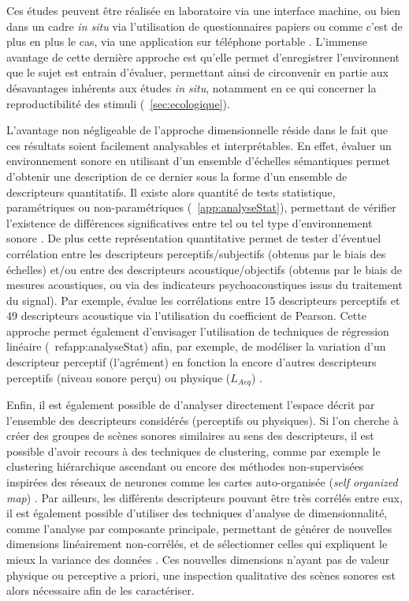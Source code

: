 Ces études peuvent être réalisée en laboratoire via une interface machine, ou bien dans un cadre \emph{in situ} via l'utilisation de questionnaires papiers \citep{jeon2013soundwalk,torija2013application} ou comme c'est de plus en plus le cas, via une application sur téléphone portable \citep{kardous2014evaluation,ricciardi2015sound}. L'immense avantage de cette dernière approche est qu'elle permet d'enregistrer l'environnent que le sujet est entrain d'évaluer, permettant ainsi de circonvenir en partie aux désavantages inhérents aux études \emph{in situ}, notamment en ce qui concerner la reproductibilité des stimuli (\Cf~\ref{sec:ecologique}).

L'avantage non négligeable de l'approche dimensionnelle réside dans le fait que ces résultats soient facilement analysables et interprétables. En effet, évaluer un environnement sonore  en utilisant d'un ensemble d'échelles sémantiques permet d'obtenir une description de ce dernier sous la forme d'un ensemble de descripteurs quantitatifs. Il existe alors quantité de tests statistique, paramétriques ou non-paramétriques (\Cf~\ref{app:analyseStat}), permettant de vérifier l'existence de différences significatives entre tel ou tel type d'environnement sonore \citep{hong2013designing}. De plus cette représentation quantitative permet de tester d'éventuel corrélation entre les descripteurs perceptifs/subjectifs (obtenus par le biais des échelles) et/ou entre des descripteurs acoustique/objectifs (obtenus par le biais de mesures acoustiques, ou via des indicateurs psychoacoustiques issus du traitement du signal). Par exemple, \citep{torija2013application} évalue les corrélations entre 15 descripteurs perceptifs et 49 descripteurs acoustique via l'utilisation du coefficient de Pearson. Cette approche permet également d'envisager l'utilisation de techniques de régression linéaire (\Cf~ref{app:analyseStat}) afin, par exemple, de modéliser la variation d'un descripteur perceptif (l'agrément) en fonction la encore d'autres descripteurs perceptifs (niveau sonore perçu) ou physique ($L_{Aeq}$) \citep{lavandier2006contribution,ricciardi2015sound}.

Enfin, il est également possible de d'analyser directement l'espace décrit par l'ensemble des descripteurs considérés (perceptifs ou physiques). Si l'on cherche à créer des groupes de scènes sonores similaires au sens des descripteurs, il est possible d'avoir recours à des techniques de clustering, comme par exemple le clustering hiérarchique ascendant \citep{torija2013application} ou encore des méthodes non-supervisées inspirées des réseaux de neurones comme les cartes auto-organisée (\emph{self organized map}) \citep{ricciardi2015sound}. Par ailleurs, les différents descripteurs pouvant être très corrélés entre eux, il est également possible d'utiliser des techniques d'analyse de dimensionnalité, comme l'analyse par composante principale, permettant de générer de nouvelles dimensions linéairement non-corrélés, et de sélectionner celles qui expliquent le mieux la variance des données \citep{cain2013development,torija2013application}. Ces nouvelles dimensions n'ayant pas de valeur physique ou perceptive a priori, une inspection qualitative des scènes sonores est alors nécessaire afin de les caractériser.

